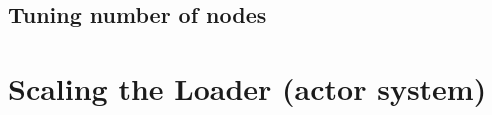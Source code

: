 \subsection{Tuning number of nodes}
\label{sec:tuning-number-of-nodes}



\section{Scaling the Loader (actor system)}
\label{sec:scaling-akka}

